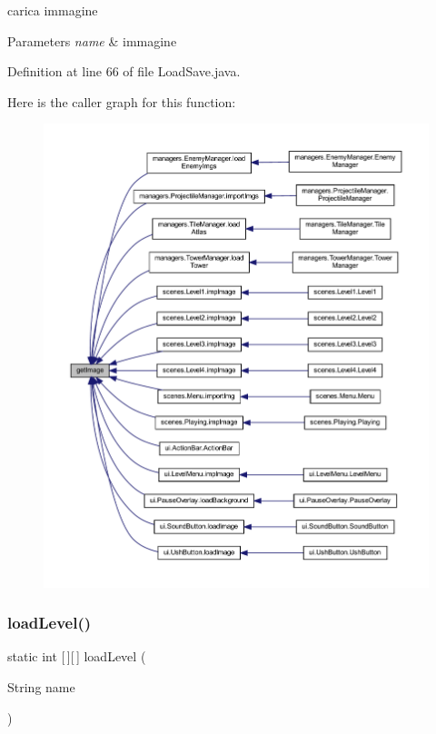 carica immagine 


\begin{DoxyParams}{Parameters}
{\em name} & immagine \\
\hline
\end{DoxyParams}


Definition at line 66 of file Load\+Save.\+java.

Here is the caller graph for this function\+:\nopagebreak
\begin{figure}[H]
\begin{center}
\leavevmode
\includegraphics[width=350pt]{classhelpz_1_1_load_save_adfcdec0c763af178ffbfea94f4ccd263_icgraph}
\end{center}
\end{figure}
\mbox{\label{classhelpz_1_1_load_save_a9dbd50db72db31e6a9c5c423d4e48be3}} 
\subsubsection{\texorpdfstring{load\+Level()}{loadLevel()}}
{\footnotesize\ttfamily static int \mbox{[}$\,$\mbox{]}\mbox{[}$\,$\mbox{]} load\+Level (\begin{DoxyParamCaption}\item[{String}]{name }\end{DoxyParamCaption})\hspace{0.3cm}{\ttfamily [static]}}



